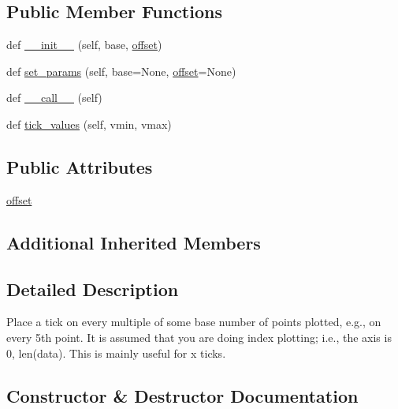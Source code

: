 \subsection*{Public Member Functions}
\begin{DoxyCompactItemize}
\item 
def \hyperlink{classmatplotlib_1_1ticker_1_1IndexLocator_a5a363de28a5f2858662cc9e8044f1896}{\+\_\+\+\_\+init\+\_\+\+\_\+} (self, base, \hyperlink{classmatplotlib_1_1ticker_1_1IndexLocator_ace3a3d02d80c6280b77a7c6a97ccfdb2}{offset})
\item 
def \hyperlink{classmatplotlib_1_1ticker_1_1IndexLocator_ad27200f01de57f73e9fc96f360a85946}{set\+\_\+params} (self, base=None, \hyperlink{classmatplotlib_1_1ticker_1_1IndexLocator_ace3a3d02d80c6280b77a7c6a97ccfdb2}{offset}=None)
\item 
def \hyperlink{classmatplotlib_1_1ticker_1_1IndexLocator_ae3dd74918d7b95809b72948d0416370d}{\+\_\+\+\_\+call\+\_\+\+\_\+} (self)
\item 
def \hyperlink{classmatplotlib_1_1ticker_1_1IndexLocator_a39cde517054241f1433d2b38d78d7d85}{tick\+\_\+values} (self, vmin, vmax)
\end{DoxyCompactItemize}
\subsection*{Public Attributes}
\begin{DoxyCompactItemize}
\item 
\hyperlink{classmatplotlib_1_1ticker_1_1IndexLocator_ace3a3d02d80c6280b77a7c6a97ccfdb2}{offset}
\end{DoxyCompactItemize}
\subsection*{Additional Inherited Members}


\subsection{Detailed Description}
\begin{DoxyVerb}Place a tick on every multiple of some base number of points
plotted, e.g., on every 5th point.  It is assumed that you are doing
index plotting; i.e., the axis is 0, len(data).  This is mainly
useful for x ticks.
\end{DoxyVerb}
 

\subsection{Constructor \& Destructor Documentation}
\mbox{\label{classmatplotlib_1_1ticker_1_1IndexLocator_a5a363de28a5f2858662cc9e8044f1896}} 
